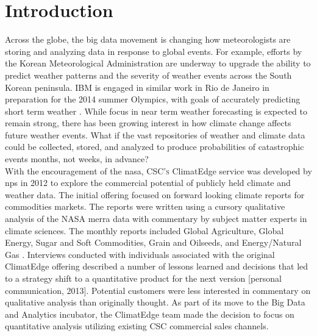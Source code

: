 \section{Introduction}
Across the globe, the big data movement is changing how meteorologists are storing and analyzing data in response to global events. For example, efforts by the Korean Meteorological Administration are underway to upgrade the ability to predict weather patterns and the severity of weather events across the South Korean peninsula. IBM is engaged in similar work in Rio de Janeiro in preparation for the 2014 summer Olympics, with goals of accurately predicting short term weather \cite{rwe}. While focus in near term weather forecasting is expected to remain strong, there has been growing interest in how climate change affects future weather events. What if the vast repositories of weather and climate data could be collected, stored, and analyzed to produce probabilities of catastrophic events months, not weeks, in advance?\\

With the encouragement of the \gls{nasa}, \textsc{CSC's} ClimatEdge\texttrademark{} service was developed by \gls{nps} in 2012 to explore the commercial potential of publicly held climate and weather data. The initial offering focused on forward looking climate reports for commodities markets. The reports were written using a cursory qualitative analysis of the NASA \gls{merra} data with commentary by subject matter experts in climate sciences. The monthly reports included Global Agriculture, Global Energy, Sugar and Soft Commodities, Grain and Oilseeds, and Energy/Natural Gas \cite{climatedgeurl}. Interviews conducted with individuals associated with the original ClimatEdge offering described a number of lessons learned and decisions that led to a strategy shift to a quantitative product for the next version [personal communication, 2013]. Potential customers were less interested in commentary on qualitative analysis than originally thought. As part of its move to the Big Data and Analytics incubator, the ClimatEdge team made the decision to focus on quantitative analysis utilizing existing CSC commercial sales channels.\\

